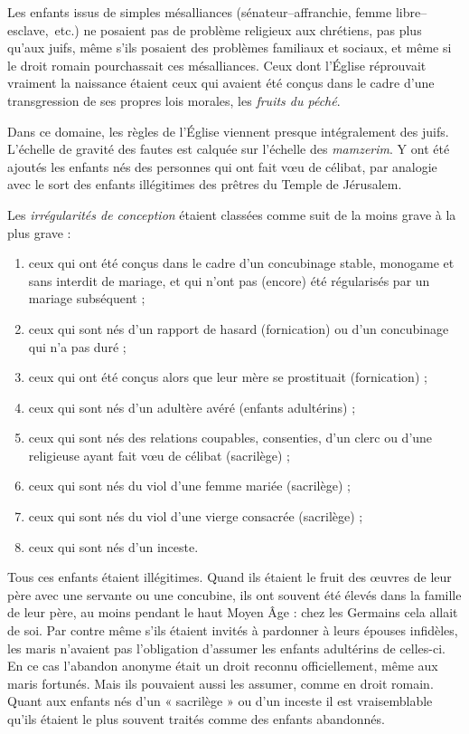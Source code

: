  Les enfants issus de simples mésalliances (sénateur--affranchie, femme libre--esclave,~etc.) ne posaient pas de problème religieux aux chrétiens, pas plus qu'aux juifs, même s'ils posaient des problèmes familiaux et sociaux, et même si le droit romain pourchassait ces mésalliances. Ceux dont l'Église réprouvait vraiment la naissance étaient ceux qui avaient été conçus dans le cadre d'une transgression de ses propres lois morales, les \emph{fruits du péché}. 

 Dans ce domaine, les règles de l'Église viennent presque intégralement des juifs. L'échelle de gravité des fautes est calquée sur l'échelle des \emph{mamzerim}. Y ont été ajoutés les enfants nés des personnes qui ont fait vœu de célibat, par analogie avec le sort des enfants illégitimes des prêtres du Temple de Jérusalem. 

 Les \emph{irrégularités de conception} étaient classées comme suit de la moins grave à la plus grave :
\begin{enumerate}
\item ceux qui ont été conçus dans le cadre d'un concubinage stable, monogame et sans interdit de mariage, et qui n'ont pas (encore) été régularisés par un mariage subséquent ;
\item ceux qui sont nés d'un rapport de hasard (fornication) ou d'un concubinage qui n'a pas duré ;
\item ceux qui ont été conçus alors que leur mère se prostituait (fornication) ;
\item ceux qui sont nés d'un adultère avéré (enfants adultérins) ;
\item ceux qui sont nés des relations coupables, consenties, d'un clerc ou d'une religieuse ayant fait vœu de célibat (sacrilège) ;
\item ceux qui sont nés du viol d'une femme mariée (sacrilège) ;
\item ceux qui sont nés du viol d'une vierge consacrée (sacrilège) ;
\item ceux qui sont nés d'un inceste. 
\end{enumerate}

 Tous ces enfants étaient illégitimes. Quand ils étaient le fruit des œuvres de leur père avec une servante ou une concubine, ils ont souvent été élevés dans la famille de leur père, au moins pendant le haut Moyen Âge : chez les Germains cela allait de soi. Par contre même s'ils étaient invités à pardonner à leurs épouses infidèles, les maris n'avaient pas l'obligation d'assumer les enfants adultérins de celles-ci. En ce cas l'abandon anonyme était un droit reconnu officiellement, même aux maris fortunés. Mais ils pouvaient aussi les assumer, comme en droit romain. Quant aux enfants nés d'un « sacrilège » ou d'un inceste il est vraisemblable qu'ils étaient le plus souvent traités comme des enfants abandonnés.
 
